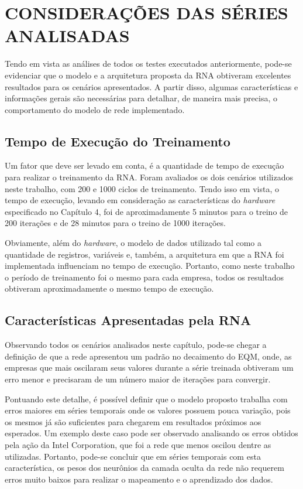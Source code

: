 \section{CONSIDERAÇÕES DAS SÉRIES ANALISADAS}
Tendo em vista as análises de todos os testes executados anteriormente, pode-se evidenciar que o modelo e a arquitetura proposta da RNA obtiveram excelentes resultados para os cenários apresentados. A partir disso, algumas características e informações gerais são necessárias para detalhar, de maneira mais precisa, o comportamento do modelo de rede implementado.

\subsection{Tempo de Execução do Treinamento}
Um fator que deve ser levado em conta, é a quantidade de tempo de execução para realizar o treinamento da RNA. Foram avaliados os dois cenários utilizados neste trabalho, com 200 e 1000 ciclos de treinamento. Tendo isso em vista, o tempo de execução, levando em consideração as características do \textit{hardware} especificado no Capítulo 4, foi de aproximadamente 5 minutos para o treino de 200 iterações e de 28 minutos para o treino de 1000 iterações. 

Obviamente, além do \textit{hardware}, o modelo de dados utilizado tal como a quantidade de registros, variáveis e, também, a arquitetura em que a RNA foi implementada influenciam no tempo de execução. Portanto, como neste trabalho o período de treinamento foi o mesmo para cada empresa, todos os resultados obtiveram aproximadamente o mesmo tempo de execução.

\subsection{Características Apresentadas pela RNA}
Observando todos os cenários analisados neste capítulo, pode-se chegar a definição de que a rede apresentou um padrão no decaimento do EQM, onde, as empresas que mais oscilaram seus valores durante a série treinada obtiveram um erro menor e precisaram de um número maior de iterações para convergir. 

Pontuando este detalhe, é possível definir que o modelo proposto trabalha com erros maiores em séries temporais onde os valores possuem pouca variação, pois os mesmos já são suficientes para chegarem em resultados próximos aos esperados. Um exemplo deste caso pode ser observado analisando os erros obtidos pela ação da Intel Corporation, que foi a rede que menos oscilou dentre as utilizadas. Portanto, pode-se concluir que em séries temporais com esta característica, os pesos dos neurônios da camada oculta da rede não requerem erros muito baixos para realizar o mapeamento e o aprendizado dos dados. 

